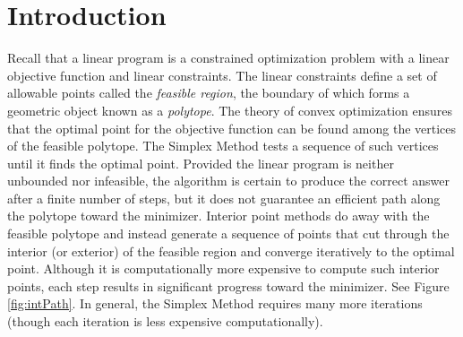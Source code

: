 
\def\Mu{\boldsymbol{\mu}}
\def\Lamb{\boldsymbol{\lambda}}
\def\Beta{\boldsymbol{\beta}}


\section*{Introduction}

Recall that a linear program is a constrained optimization problem with a linear objective function and linear constraints.
The linear constraints define a set of allowable points called the \emph{feasible region}, the boundary of which forms a geometric object known as a \emph{polytope}.
The theory of convex optimization ensures that the optimal point for the objective function can be found among the vertices of the feasible polytope. The Simplex Method tests a sequence of such vertices until it finds
the optimal point.
Provided the linear program is neither unbounded nor infeasible, the algorithm is certain to produce the correct answer after a finite number of steps, but it does not guarantee an efficient path along the polytope toward the minimizer.
Interior point methods do away with the feasible polytope and instead generate a sequence of points that cut through the interior (or exterior) of the feasible region and converge iteratively to the optimal point.
Although it is computationally more expensive to compute such interior points, each step results in significant progress toward the minimizer.
See Figure \ref{fig:intPath}.
In general, the Simplex Method requires many more iterations (though each iteration is less expensive computationally).

